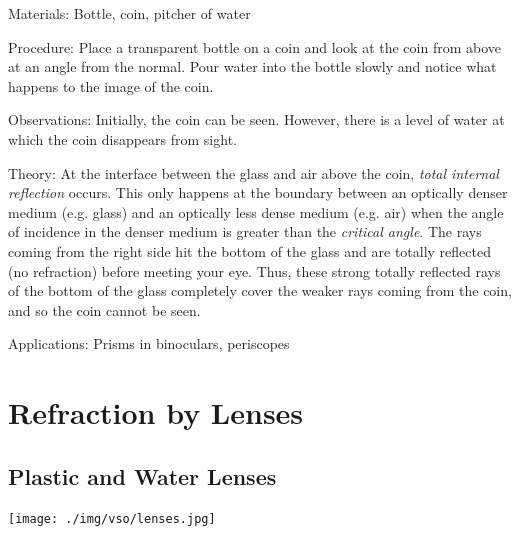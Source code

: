 \begin{multicols}{2}
\begin{description*}
\item[Materials:]{Bottle, coin, pitcher of water}
\item[Procedure:]{Place a transparent bottle on a coin and look at the coin from above at an angle from the normal. Pour water into the bottle slowly and notice what happens to the image of the coin.}
\item[Observations:]{Initially, the coin can be seen. However, there is a level of water at which the coin disappears from sight.}
\item[Theory:]{At the interface between the glass and air above the coin, \emph{total internal reflection} occurs. This only happens at the boundary between an optically denser medium (e.g. glass) and an optically less dense medium (e.g. air) when the angle of incidence in the denser medium is greater than the \emph{critical angle}. The rays coming from the right side hit the bottom of the glass and are totally reflected (no refraction) before meeting your eye. Thus, these strong totally reflected rays of the bottom of the glass completely cover the weaker rays coming from the coin, and so the coin cannot be seen.}
\item[Applications:]{Prisms in binoculars, periscopes}
\end{description*}


\section*{Refraction by Lenses}


\subsection{Plastic and Water Lenses}

\begin{center}
\texttt{[image: ./img/vso/lenses.jpg]}
\end{center}


\end{multicols}
